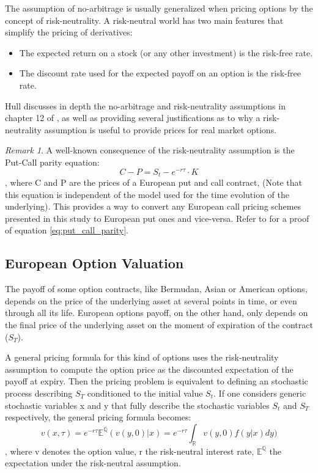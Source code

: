 \documentclass[12,twoside]{mammeTFM}
\theoremstyle{definition}
\theoremstyle{remark}
\newtheorem{remark}[thm]{Remark}
\newcommand{\E}{\ensuremath{\mathbb{E}}}
\newcommand{\Q}{\ensuremath{\mathbb{Q}}}
\newcommand{\R}{\ensuremath{\mathbb{R}}}
\begin{document}
The assumption of no-arbitrage is usually generalized when pricing options by the concept of risk-neutrality. A risk-neutral world has two main features that simplify the pricing of derivatives:
\begin{itemize}
\item The expected return on a stock (or any other investment) is the risk-free rate.
\item The discount rate used for the expected payoff on an option is the risk-free rate.
\end{itemize}

Hull discusses in depth the no-arbitrage and risk-neutrality assumptions in chapter 12 of \cite{hul09}, as well as providing several justifications as to why a risk-neutrality assumption is useful to provide prices for real market options.

\begin{remark}
A well-known consequence of the risk-neutrality assumption is the Put-Call parity equation:
\begin{equation}\label{eq:put_call_parity}
C - P = S_t - e^{-r\tau} \cdot K
\end{equation}
, where C and P are the prices of a European put and call contract, (Note that this equation is independent of the model used for the time evolution of the underlying). This provides a way to convert any European call pricing schemes presented in this study to European put ones and vice-versa. Refer to \cite{hul09} for a proof of equation \ref{eq:put_call_parity}.
\end{remark}

\subsection{European Option Valuation} \label{subsec:european_option_valuation}
The payoff of some option contracts, like Bermudan, Asian or American options, depends on the price of the underlying asset at several points in time, or even through all its life. European options payoff, on the other hand, only depends on the final price of the underlying asset on the moment of expiration of the contract ($S_T$). 

A general pricing formula for this kind of options uses the risk-neutrality assumption to compute the option price as the discounted expectation of the payoff at expiry. Then the pricing problem is equivalent to defining an stochastic process describing $S_T$ conditioned to the initial value $S_t$. If one considers generic stochastic variables x and y that fully describe the stochastic variables $S_t$ and $S_T$ respectively, the general pricing formula becomes:
\begin{equation}
\label{eq:integral_option_valuation}
v(x, \tau)  = e^{-r \tau}\E^{\Q}(v(y, 0)|x)  = e^{-r\tau} \int_{\R}v(y,0)f(y|x)dy)
\end{equation}
, where v denotes the option value, r the risk-neutral interest rate, $\E^{\Q}$ the expectation under the risk-neutral assumption.
\end{document}
